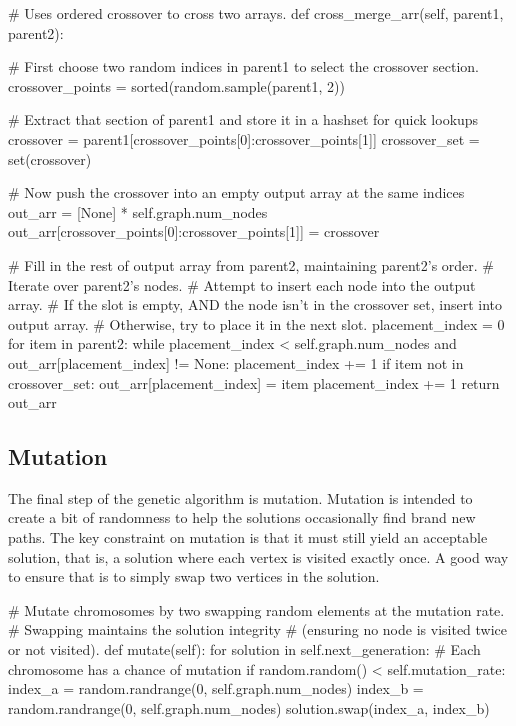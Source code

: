 \begin{python}
# Uses ordered crossover to cross two arrays.
def cross_merge_arr(self, parent1, parent2):

  # First choose two random indices in parent1 to select the crossover section.
  crossover_points = sorted(random.sample(parent1, 2))
  
  # Extract that section of parent1 and store it in a hashset for quick lookups
  crossover = parent1[crossover_points[0]:crossover_points[1]]
  crossover_set = set(crossover)                
  
  # Now push the crossover into an empty output array at the same indices
  out_arr = [None] * self.graph.num_nodes
  out_arr[crossover_points[0]:crossover_points[1]] = crossover

  # Fill in the rest of output array from parent2, maintaining parent2's order.
  # Iterate over parent2's nodes.
  # Attempt to insert each node into the output array. 
  # If the slot is empty, AND the node isn't in the crossover set, insert into output array.
  # Otherwise, try to place it in the next slot.
  placement_index = 0
  for item in parent2:
    while placement_index < self.graph.num_nodes and out_arr[placement_index] != None:
      placement_index += 1
    if item not in crossover_set:
      out_arr[placement_index] = item
      placement_index += 1
  return out_arr
\end{python} 

\subsection{Mutation}

The final step of the genetic algorithm is mutation. Mutation is intended to create a bit of randomness to help the solutions occasionally find brand new paths. The key constraint on mutation is that it must still yield an acceptable solution, that is, a solution where each vertex is visited exactly once. A good way to ensure that is to simply swap two vertices in the solution.

\begin{python}
# Mutate chromosomes by two swapping random elements at the mutation rate.
# Swapping maintains the solution integrity 
# (ensuring no node is visited twice or not visited).
def mutate(self):
  for solution in self.next_generation:
  # Each chromosome has a chance of mutation
    if random.random() < self.mutation_rate: 
      index_a = random.randrange(0, self.graph.num_nodes)
      index_b = random.randrange(0, self.graph.num_nodes)
      solution.swap(index_a, index_b)
\end{python}